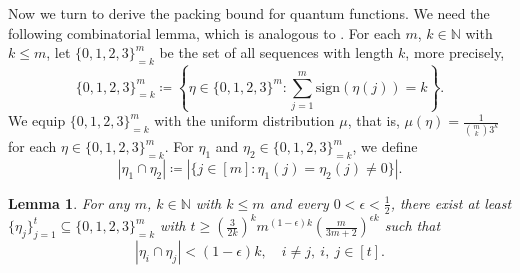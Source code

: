 \documentclass{amsbook}
\newtheorem{lemma}[theorem]{Lemma}
\theoremstyle{definition}
\theoremstyle{remark}
\numberwithin{section}{chapter}
\numberwithin{equation}{chapter}
\newcommand{\1}{\mathbf{1}}
\begin{document}
Now we turn to derive the packing bound for quantum  functions. We need the following combinatorial lemma, which is analogous to \cite[Lemma 12]{EIS2023}. For each $m$, $k\in \mathbb{N}$ with $k\leq m$, let $\{0,1,2,3\}^{m}_{=k}$ be the set of all sequences with length $k$, more precisely,
\[
\{0,1,2,3\}^{m}_{=k}\coloneqq \left\{\eta\in \{0,1,2,3\}^{m}:\sum_{j=1}^{m}\mathrm{sign}(\eta(j))=k\right\}.
\]
We equip $\{0,1,2,3\}^{m}_{=k}$ with the uniform distribution $\mu$, that is, $\mu(\eta)=\frac{1}{\binom{m}{k}3^{k}}$ for each $\eta\in\{0,1,2,3\}^{m}_{=k}$. For $\eta_{1}$ and $\eta_{2}\in\{0,1,2,3\}^{m}_{=k}$, we define $$|\eta_{1}\cap\eta_{2}|\coloneqq |\{j\in [m]:\eta_{1}(j)= \eta_{2}(j)\neq 0\}|.$$
\begin{lemma}\label{packing number lemma}
For any $m$, $k\in \mathbb{N}$ with $k\leq m$ and every $0<\epsilon<\frac{1}{2}$, there exist at least $\{\eta_{j}\}_{j=1}^{t}\subseteq \{0,1,2,3\}^{m}_{=k}$ with $t\geq \left(\frac{3}{2k}\right)^{k}m^{(1-\epsilon)k}\left(\frac{m}{3m+2}\right)^{\epsilon k}$ such that
\[
|\eta_{i}\cap \eta_{j}|<(1-\epsilon)k,\quad i\neq j,~i,~j\in [t].
\]
\end{lemma}
\end{document}
